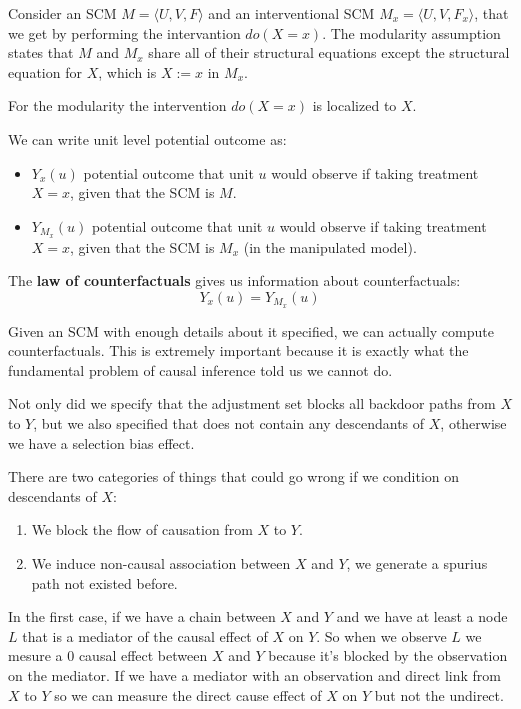 \begin{definition}
    Consider an SCM $M=\langle U, V, F \rangle$ and an interventional SCM $M_x =\langle U, V, F_x \rangle$,
    that we get by performing the intervantion $do(X = x)$. The modularity assumption states 
    that $M$ and $M_x$ share all of their structural equations except the structural equation
    for $X$, which is $X := x$ in $M_x$. 
\end{definition}

For the modularity the intervention $do(X=x)$ is localized to $X$.

We can write unit level potential outcome as:
\begin{itemize}
    \item $Y_x (u)$ potential outcome that unit $u$ would observe if taking treatment
        $X = x$, given that the SCM is $M$.
    \item $Y_{M_x}(u)$ potential outcome that unit $u$ would observe if taking treatment
        $X = x$, given that the SCM is $M_x$ (in the manipulated model).
\end{itemize}

The \textbf{law of counterfactuals} gives us information about counterfactuals:
\begin{equation}
    Y_x(u) = Y_{M_x}(u)
\end{equation}

Given an SCM with enough details about it specified, we can actually compute 
counterfactuals. This is extremely important because it is exactly what the fundamental 
problem of causal inference told us we cannot do.

Not only did we specify that the adjustment set blocks all backdoor paths from $X$ to $Y$,
but we also specified that does not contain any descendants of $X$, otherwise we have 
a selection bias effect. 

There are two categories of things that could go wrong if we condition on descendants 
of $X$:
\begin{enumerate}
    \item We block the flow of causation from $X$ to $Y$. 
    \item We induce non-causal association between $X$ and $Y$, we generate a spurius 
    path not existed before.
\end{enumerate}

In the first case, if we have a chain between $X$ and $Y$ and we have at least a 
node $L$ that is a mediator of the causal effect of $X$ on $Y$. So when 
we observe $L$ we mesure a $0$ causal effect between $X$ and $Y$ because it's blocked 
by the observation on the mediator. If we have a mediator with an observation and direct link from $X$ 
to $Y$ so we can measure the direct cause effect of $X$ on $Y$ but not the undirect.


